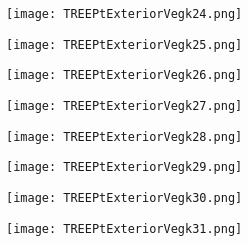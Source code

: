\documentclass[pdf]{beamer}
\begin{document}
\begin{frame}
\begin{figure}[!h]
\centering
\texttt{[image: TREEPtExteriorVegk24.png]}
\end{figure}
\end{frame}

\begin{frame}
\begin{figure}[!h]
\centering
\texttt{[image: TREEPtExteriorVegk25.png]}
\end{figure}
\end{frame}

\begin{frame}
\begin{figure}[!h]
\centering
\texttt{[image: TREEPtExteriorVegk26.png]}
\end{figure}
\end{frame}

\begin{frame}
\begin{figure}[!h]
\centering
\texttt{[image: TREEPtExteriorVegk27.png]}
\end{figure}
\end{frame}

\begin{frame}
\begin{figure}[!h]
\centering
\texttt{[image: TREEPtExteriorVegk28.png]}
\end{figure}
\end{frame}

\begin{frame}
\begin{figure}[!h]
\centering
\texttt{[image: TREEPtExteriorVegk29.png]}
\end{figure}
\end{frame}

\begin{frame}
\begin{figure}[!h]
\centering
\texttt{[image: TREEPtExteriorVegk30.png]}
\end{figure}
\end{frame}

\begin{frame}
\begin{figure}[!h]
\centering
\texttt{[image: TREEPtExteriorVegk31.png]}
\end{figure}
\end{frame}
\end{document}
